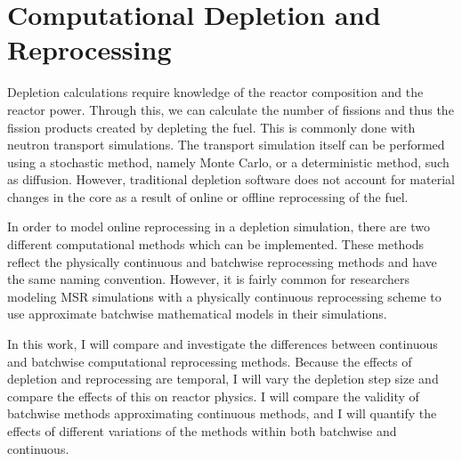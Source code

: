 \section{Computational Depletion and Reprocessing}

Depletion calculations require knowledge of the reactor composition and the reactor power. Through this, we can calculate the number of fissions and thus the fission products created by depleting the fuel. This is commonly done with neutron transport simulations.
The transport simulation itself can be performed using a stochastic method, namely Monte Carlo, or a deterministic method, such as diffusion. 
However, traditional depletion software does not account for material changes in the core as a result of online or offline reprocessing of the fuel.



In order to model online reprocessing in a depletion simulation, there are two different computational methods which can be implemented. These methods reflect the physically continuous and batchwise reprocessing methods and have the same naming convention.
However, it is fairly common for researchers modeling MSR simulations with a physically continuous reprocessing scheme to use approximate batchwise mathematical models in their simulations.

In this work, I will compare and investigate the differences between continuous and batchwise computational reprocessing methods.
Because the effects of depletion and reprocessing are temporal, I will vary the depletion step size and compare the effects of this on reactor physics.
I will compare the validity of batchwise methods approximating continuous methods, and I will quantify the effects of different variations of the methods within both batchwise and continuous.
